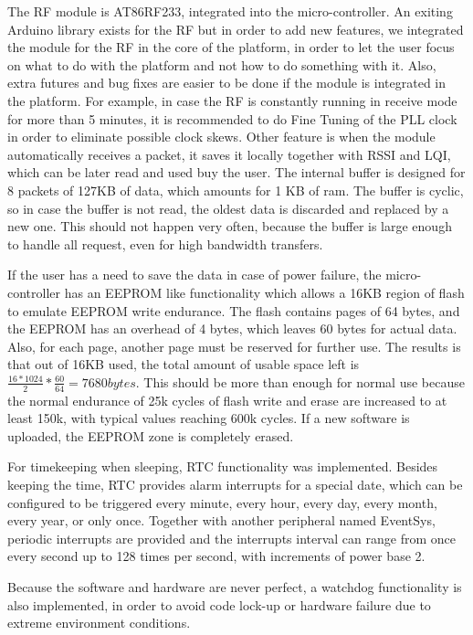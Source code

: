 The RF module is AT86RF233, integrated into the micro-controller. An exiting Arduino library
\cite{rf233}
exists for the RF but in order to add new features, we integrated the module for the RF in the core
of the platform, in order to let the user focus on what to do with the platform and not how to do
something with it. Also, extra futures and bug fixes are easier to be done if the module is
integrated in the platform. For example, in case the RF is constantly running in receive mode for
more than 5 minutes, it is recommended to do Fine Tuning of the PLL clock in order to eliminate
possible clock skews. Other feature is when the module automatically receives a packet, it saves it
locally together with RSSI and LQI, which can be later read and used buy the user. The internal
buffer is designed for 8 packets of 127KB of data, which amounts for 1 KB of ram. The buffer is
cyclic, so in case the buffer is not read, the oldest data is discarded and replaced by a new one.
This should not happen very often, because the buffer is large enough to handle all request, even
for high bandwidth transfers.

If the user has a need to save the data in case of power failure, the micro-controller has an
EEPROM like functionality which allows a 16KB region of flash to emulate EEPROM write endurance.
The flash contains pages of 64 bytes, and the EEPROM has an overhead of 4 bytes, which leaves 60
bytes for actual data. Also, for each page, another page must be reserved for further use.
The results is that out of 16KB used, the total amount of usable space left is $\frac{16*1024}{2}
* \frac{60}{64} = 7680 bytes$. This should be more than enough for normal use because the normal
endurance of 25k cycles of flash write and erase are increased to at least 150k, with typical
values reaching 600k cycles. If a new software is uploaded, the EEPROM zone is completely erased.

For timekeeping when sleeping, RTC functionality was implemented. Besides keeping the time, RTC
provides alarm interrupts for a special date, which can be configured to be triggered every
minute, every hour, every day, every month, every year, or only once. Together with another
peripheral named EventSys, periodic interrupts are provided and the interrupts interval can range
from once every second up to 128 times per second, with increments of power base 2.

Because the software and hardware are never perfect, a watchdog functionality is also implemented,
in order to avoid code lock-up or hardware failure due to extreme environment conditions.

